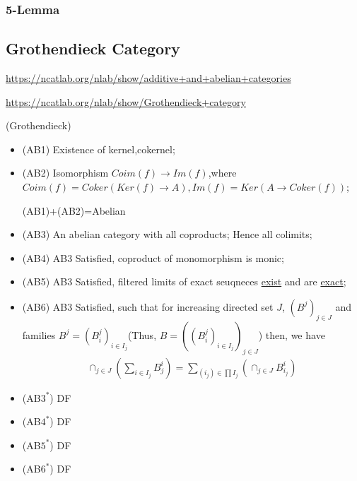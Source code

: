 \documentclass[Total.tex]{subfiles}
\begin{document}
					\subsubsection{5-Lemma}
				\subsection{Grothendieck Category}
				
				\url{https://ncatlab.org/nlab/show/additive+and+abelian+categories}
				
				\url{https://ncatlab.org/nlab/show/Grothendieck+category}
				\begin{Def}
					(Grothendieck) 
					\begin{itemize}
						\item (AB1) Existence of kernel,cokernel;
						\item (AB2) Isomorphism $Coim(f)\rightarrow Im(f)$,where $Coim(f)=Coker(Ker(f)\rightarrow A),Im(f)=Ker(A\rightarrow Coker(f))$;
						
						(AB1)+(AB2)=Abelian
						\item (AB3) An abelian category with all coproducts; Hence all colimits;
						\item (AB4) AB3 Satisfied, coproduct of monomorphism is monic;
						\item (AB5) AB3 Satisfied, filtered limits of exact seuqneces \underline{exist} and are \underline{exact};
						\item (AB6) AB3 Satisfied, such that for increasing directed set $J$, $(B^j)_{j\in J}$ and families $B^j=(B^j_i)_{i\in I_j}$(Thus, $B=((B^j_i)_{i\in I_j})_{j\in J}$) then, we have
						\begin{gather*}
							\cap_{j\in J} (\sum_{i\in I_j} B^i_j)=\sum_{(i_j)\in \prod I_j} (\cap_{j\in J} B^i_{i_j})
						\end{gather*}
						\item (AB$3^*$) DF
						\item (AB$4^*$) DF
						\item (AB$5^*$) DF
						\item (AB$6^*$) DF	
					\end{itemize}
				\end{Def}
\end{document}
